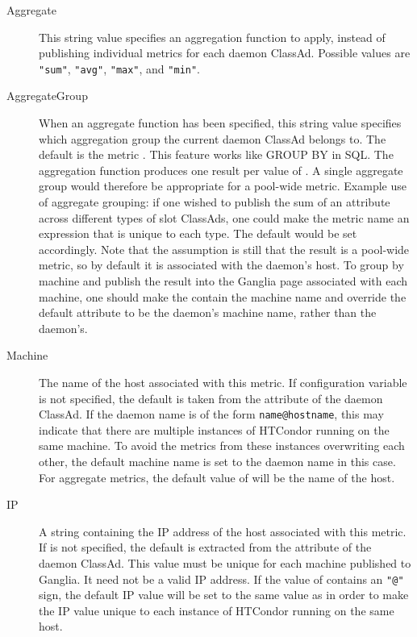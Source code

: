 \begin{description}
  \item[Aggregate] This string value specifies an aggregation function
    to apply, instead of publishing individual metrics for each daemon
    ClassAd.  Possible values are \verb|"sum"|, \verb|"avg"|, \verb|"max"|,
    and \verb|"min"|.

  \item[AggregateGroup] When an aggregate function has been specified,
    this string value specifies which aggregation group the current
    daemon ClassAd belongs to.  The default is the metric .  This
    feature works like GROUP BY in SQL.  The aggregation function
    produces one result per value of .  A single
    aggregate group would therefore be appropriate for a pool-wide
    metric.  Example use of aggregate grouping: if one wished to
    publish the sum of an attribute across different types of slot
    ClassAds, one could make the metric name an expression that is unique
    to each type.  The default  would be set
    accordingly.  Note that the assumption is still that the result
    is a pool-wide metric, so by default it is associated with the
     daemon's host.
    To group by machine and publish the result into
    the Ganglia page associated with each machine, one should make
    the  contain the machine name and override
    the default  attribute to be the daemon's machine
    name, rather than the  daemon's.

  \item[Machine] The name of the host associated with this metric.  
    If configuration variable
     is not specified, 
    the default
    is taken from the  attribute of the daemon ClassAd.
    If the daemon name is of the form \verb|name@hostname|, this may
    indicate that there are multiple instances of HTCondor running on
    the same machine.  To avoid the metrics from these instances
    overwriting each other, the default machine name is set to the
    daemon name in this case.  For aggregate metrics, the default
    value of  will be the name of the  host.

  \item[IP] A string containing the IP address of the host associated
    with this metric.  If  is not
    specified, the default is extracted from the 
    attribute of the daemon ClassAd.  This value must be unique for each
    machine published to Ganglia.  It need not be a valid IP address.
    If the value of  contains an \verb|"@"| sign, the
    default IP value will be set to the same value as 
    in order to make the IP value unique to each instance of HTCondor
    running on the same host.

  \end{description}


